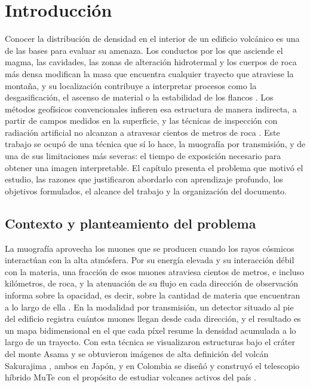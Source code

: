 \chapter{Introducción}
\label{chap:introduccion}


Conocer la distribución de densidad en el interior de un edificio volcánico es una de las bases para evaluar su amenaza. Los conductos por los que asciende el magma, las cavidades, las zonas de alteración hidrotermal y los cuerpos de roca más densa modifican la masa que encuentra cualquier trayecto que atraviese la montaña, y su localización contribuye a interpretar procesos como la desgasificación, el ascenso de material o la estabilidad de los flancos \parencite{tanaka2007asama,tanaka2023muography}. Los métodos geofísicos convencionales infieren esa estructura de manera indirecta, a partir de campos medidos en la superficie, y las técnicas de inspección con radiación artificial no alcanzan a atravesar cientos de metros de roca \parencite{bonomi2020}. Este trabajo se ocupó de una técnica que sí lo hace, la muografía por transmisión, y de una de sus limitaciones más severas: el tiempo de exposición necesario para obtener una imagen interpretable. El capítulo presenta el problema que motivó el estudio, las razones que justificaron abordarlo con aprendizaje profundo, los objetivos formulados, el alcance del trabajo y la organización del documento.

\section{Contexto y planteamiento del problema}
\label{sec:intro-problema}

La muografía aprovecha los muones que se producen cuando los rayos cósmicos interactúan con la alta atmósfera. Por su energía elevada y su interacción débil con la materia, una fracción de esos muones atraviesa cientos de metros, e incluso kilómetros, de roca, y la atenuación de su flujo en cada dirección de observación informa sobre la opacidad, es decir, sobre la cantidad de materia que encuentran a lo largo de ella \parencite{bonomi2020,tanaka2023muography}. En la modalidad por transmisión, un detector situado al pie del edificio registra cuántos muones llegan desde cada dirección, y el resultado es un mapa bidimensional en el que cada píxel resume la densidad acumulada a lo largo de un trayecto. Con esta técnica se visualizaron estructuras bajo el cráter del monte Asama \parencite{tanaka2007asama} y se obtuvieron imágenes de alta definición del volcán Sakurajima \parencite{olah2018sakurajima}, ambos en Japón, y en Colombia se diseñó y construyó el telescopio híbrido MuTe con el propósito de estudiar volcanes activos del país \parencite{penarodriguez2020}.

